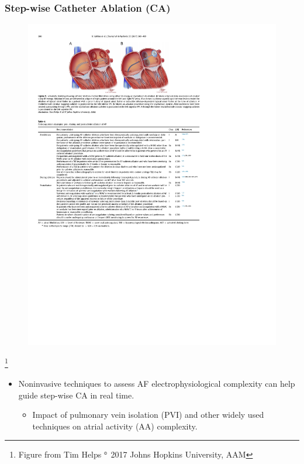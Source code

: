 \documentclass{beamer}
\newcommand\blfootnote[1]{%
   \begingroup
   \renewcommand\thefootnote{}\footnote{#1}%
   \addtocounter{footnote}{-1}%
   \endgroup
}
\begin{document}
	\begin{frame}
		\frametitle{Step-wise Catheter Ablation (CA)}
		
		\begin{figure}[h]
			\centering
			\includegraphics[scale=1.2,clip=true,trim={3.55cm 21.95cm 13.8cm 2.0cm}]{CA_figure.pdf}
		\end{figure}
		\blfootnote{Figure from Tim Helps $^{\text{\tiny{\copyright}}}$ 2017 Johns Hopkins University, AAM}
		\vspace{-0.8cm}
		\begin{itemize}
			\item Noninvasive techniques to assess AF electrophysiological complexity can help guide step-wise CA in real time.
			\begin{itemize}
				\item Impact of pulmonary vein isolation (PVI) and other widely used techniques on atrial activity (AA) complexity.
			\end{itemize}
		\end{itemize}
	\end{frame}
\end{document}
